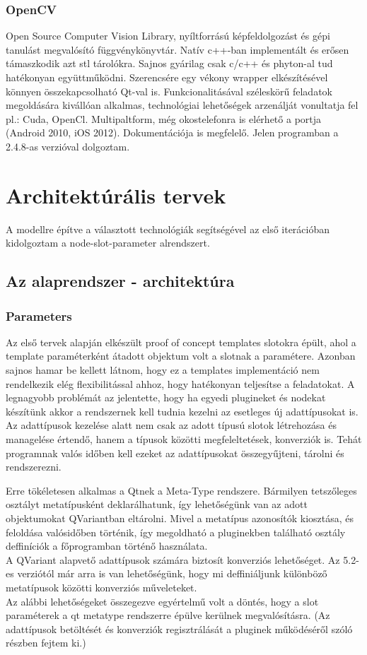 \documentclass[a4paper,12pt,oneside]{report}
\begin{document}
\subsubsection{OpenCV}	
Open Source Computer Vision Library, nyíltforrású képfeldolgozást és gépi tanulást megvalósító függvénykönyvtár.\cite{website:opencv_about} Natív c++-ban implementált és erősen támaszkodik azt stl tárolókra. Sajnos gyárilag csak c/c++ és phyton-al tud hatékonyan együttműködni. Szerencsére egy vékony wrapper elkészítésével könnyen összekapcsolható Qt-val is. Funkcionalitásával széleskörű feladatok megoldására kivállóan alkalmas, technológiai lehetőségek arzenálját vonultatja fel pl.: Cuda, OpenCl. Multipaltform, még okostelefonra is elérhető a portja (Android 2010, iOS 2012). Dokumentációja is megfelelő. Jelen programban a 2.4.8-as verzióval dolgoztam.


\section{Architektúrális tervek}
A modellre építve a választott technológiák segítségével az első iterációban kidolgoztam a node-slot-parameter alrendszert.
\subsection{Az alaprendszer - architektúra}
\subsubsection{Parameters}
Az első tervek alapján elkészült proof of concept templates slotokra épült, ahol a template paraméterként átadott objektum volt a slotnak a paramétere. Azonban sajnos hamar be kellett látnom, hogy ez a templates implementáció nem rendelkezik elég flexibilitással ahhoz, hogy hatékonyan teljesítse a feladatokat. A legnagyobb problémát az jelentette, hogy ha egyedi plugineket és nodekat készítünk akkor a rendszernek kell tudnia kezelni az esetleges új adattípusokat is. Az adattípusok kezelése alatt nem csak az adott típusú slotok létrehozása és managelése értendő, hanem a típusok közötti megfeleltetések, konverziók is. Tehát programnak valós időben kell ezeket az adattípusokat összegyűjteni, tárolni és rendszerezni.

Erre tökéletesen alkalmas a Qtnek a Meta-Type rendszere. Bármilyen tetszőleges osztályt metatípusként deklarálhatunk, így lehetőségünk van az adott objektumokat QVariantban eltárolni. \cite{website:qt_metatype_1} Mivel a metatípus azonosítók kiosztása, és feloldása valósidőben történik, így megoldható a pluginekben található osztály deffiníciók a főprogramban történő használata.\\
A QVariant alapvető adattípusok számára biztosít konverziós lehetőséget. Az 5.2-es verziótól már arra is van lehetőségünk, hogy mi deffiniáljunk különböző metatípusok közötti konverziós műveleteket. \\ Az alábbi lehetőségeket összegezve egyértelmű volt a döntés, hogy a slot paraméterek a qt metatype rendszerre épülve kerülnek megvalósításra. (Az adattípusok betöltését és konverziók regisztrálását a pluginek működéséről szóló részben fejtem ki.)
\end{document}
